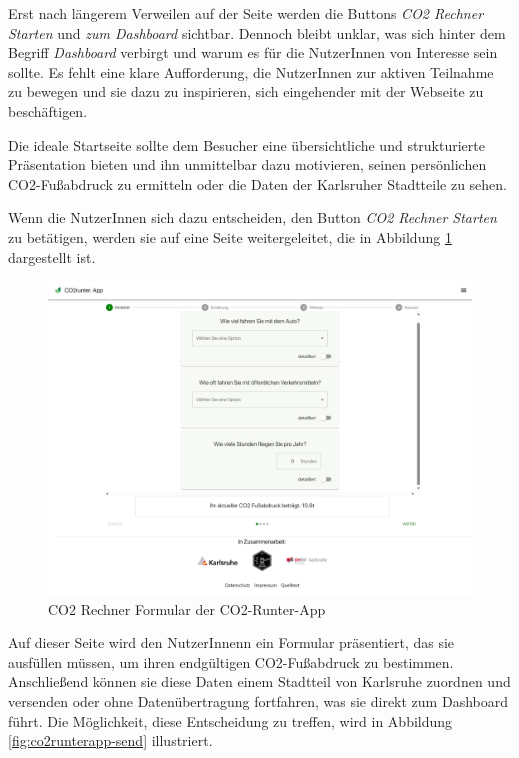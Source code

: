 Erst nach längerem Verweilen auf der Seite werden die Buttons \textit{CO2 Rechner Starten} und \textit{zum Dashboard} sichtbar. Dennoch bleibt unklar, was sich hinter dem Begriff \textit{Dashboard} verbirgt und warum es für die NutzerInnen von Interesse sein sollte. Es fehlt eine klare Aufforderung, die NutzerInnen zur aktiven Teilnahme zu bewegen und sie dazu zu inspirieren, sich eingehender mit der Webseite zu beschäftigen.

Die ideale Startseite sollte dem Besucher eine übersichtliche und strukturierte Präsentation bieten und ihn unmittelbar dazu motivieren, seinen persönlichen CO2-Fußabdruck zu ermitteln oder die Daten der Karlsruher Stadtteile zu sehen.

Wenn die NutzerInnen sich dazu entscheiden, den Button \textit{CO2 Rechner Starten} zu betätigen, werden sie auf eine Seite weitergeleitet, die in Abbildung \ref{fig:co2runterapp-rechner} dargestellt ist.

\begin{figure}[h]
    \centering
    \includegraphics[width=1\textwidth]{images/02/CO2-Runter-App-Rechner.jpeg}
    \caption{CO2 Rechner Formular der CO2-Runter-App}
    \label{fig:co2runterapp-rechner}
\end{figure}

Auf dieser Seite wird den NutzerInnenn ein Formular präsentiert, das sie ausfüllen müssen, um ihren endgültigen CO2-Fußabdruck zu bestimmen. Anschließend können sie diese Daten einem Stadtteil von Karlsruhe zuordnen und versenden oder ohne Datenübertragung fortfahren, was sie direkt zum Dashboard führt. Die Möglichkeit, diese Entscheidung zu treffen, wird in Abbildung \ref{fig:co2runterapp-send} illustriert.

